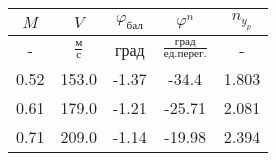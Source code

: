 \begin{tabular}{|c|c|c|c|c|}
\hline
$M$ & $V$ & $\varphi_{бал}$ & $\varphi^{n}$ & $n_{y_{p}}$ \\ 
\hline
- & $\frac{м}{с}$ & град & $\frac{град}{ед.перег.}$ & - \\ 
\hline
0.52 & 153.0 & -1.37 & -34.4 & 1.803 \\ 
\hline
0.61 & 179.0 & -1.21 & -25.71 & 2.081 \\ 
\hline
0.71 & 209.0 & -1.14 & -19.98 & 2.394 \\ 
\hline
\end{tabular}